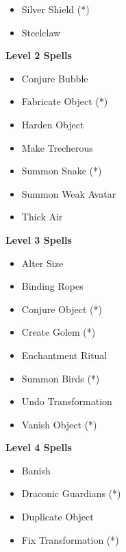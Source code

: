 \begin{multicols}{4}
{\begin{itemize}[itemsep=0em]
\item Silver Shield (*) 

\item Steelclaw


\end{itemize}
\textbf{Level 2 Spells}
\begin{itemize}[itemsep=0em]
\renewcommand\labelitemi{-}
\item Conjure Bubble

\item Fabricate Object (*) 

\item Harden Object

\item Make Trecherous

\item Summon Snake (*) 

\item Summon Weak Avatar

\item Thick Air


\end{itemize}
\textbf{Level 3 Spells}
\begin{itemize}[itemsep=0em]
\renewcommand\labelitemi{-}
\item Alter Size

\item Binding Ropes

\item Conjure Object (*) 

\item Create Golem (*) 

\item Enchantment Ritual

\item Summon Birds (*) 

\item Undo Transformation

\item Vanish Object (*) 


\end{itemize}
\textbf{Level 4 Spells}
\begin{itemize}[itemsep=0em]
\renewcommand\labelitemi{-}
\item Banish

\item Draconic Guardians (*) 

\item Duplicate Object

\item Fix Transformation (*) 


\end{itemize}}
\end{multicols}
